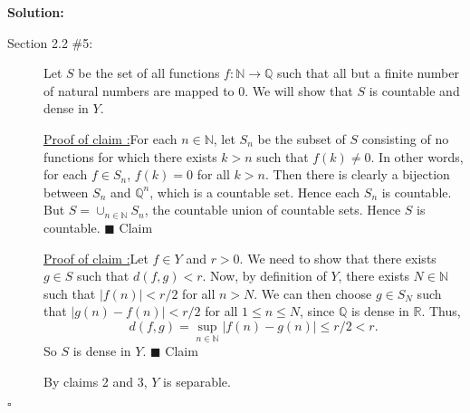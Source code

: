 \documentclass[12pt]{article}
\newcounter{ProofCounter}
\newcounter{ClaimCounter}[ProofCounter]
\newenvironment{Solution}{\stepcounter{ProofCounter}\textbf{Solution:}}{\hfill$\square$}
\newenvironment{claim}[1]{\vspace{1mm}\stepcounter{ClaimCounter}\par\noindent\underline{\bf Claim \theClaimCounter:}\space#1}{}
\newenvironment{claimproof}[1]{\par\noindent\underline{Proof of claim \theClaimCounter:}\space#1}{\hfill $\blacksquare$ Claim \theClaimCounter}
\begin{document}
\begin{Solution}
\begin{description}
    \item[Section 2.2 \#5:] Let $S$ be the set of all functions $f : \mathbb{N} \rightarrow \mathbb{Q}$ such that all but a finite number of natural
      numbers are mapped to 0. We will show that $S$ is countable and dense in $Y$.

      \begin{claimproof}
        For each $n \in \mathbb{N}$, let $S_n$ be the subset of $S$ consisting of no functions for which there exists $k > n$ such that $f(k) \neq
        0$. In other words, for each $f \in S_n$, $f(k) = 0$ for all $k > n$. Then there is clearly a bijection between $S_n$ and $\mathbb{Q}^{n}$, which is a countable set. Hence each $S_n$ is countable.
        But $S = \cup_{n\in\mathbb{N}}S_n$, the countable union of countable sets. Hence $S$ is countable.
      \end{claimproof}

      \begin{claimproof}
        Let $f \in Y$ and $r > 0$. We need to show that there exists $g \in S$ such that $d(f,g) < r$. Now, by definition of $Y$, there exists $N \in
        \mathbb{N}$ such that $|f(n)| < r/2$ for all $n > N$. We can then choose $g \in S_N$ such that $|g(n) - f(n)| < r/2$ for all $1 \leq n \leq
        N$, since $\mathbb{Q}$ is dense in $\mathbb{R}$. Thus,
        \[
          d(f,g) = \sup_{n\in\mathbb{N}}|f(n) - g(n)| \leq r / 2 < r.
        \]
        So $S$ is dense in $Y$.
      \end{claimproof}


      By claims 2 and 3, $Y$ is separable.
  \end{description}
\end{Solution}
\end{document}
